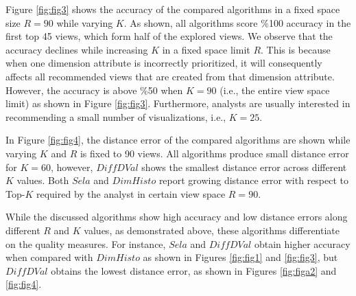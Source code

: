 Figure \ref{fig:fig3} shows the accuracy of the compared algorithms in a fixed space size $R=90$ while varying $K$. 
%
As shown, all algorithms score \%100 accuracy in the first top 45 views, which form half of the explored views.
%
We observe that the accuracy declines while increasing $K$ in a fixed space limit $R$.
% 
This is because when one dimension attribute is incorrectly prioritized, it will consequently affects all 
recommended views that are created from that dimension attribute. 
%
However, the accuracy is above \%50 when $K=90$ (i.e., the entire view space limit) as shown in Figure \ref{fig:fig3}. 
%
Furthermore, analysts are usually interested in recommending a small number of visualizations, i.e., $K=25$.

In Figure \ref{fig:fig4}, the distance error  of the compared algorithms are shown while varying $K$ and $R$ is fixed to 90 views.
%
All algorithms produce small distance error for $K=60$, however, $Diff DVal$ shows the smallest distance error across different $K$ values. 
%
Both $Sela$  and $DimHisto$ report growing distance error with respect to Top-$K$ required by the analyst in certain view space $R=90$.
%

While the discussed algorithms show high accuracy and low distance errors along different $R$ and $K$ values, as  demonstrated above, these algorithms differentiate on the quality measures.
%
For instance, $Sela$ and $Diff DVal$ obtain higher accuracy when compared with $DimHisto$ as shown in Figures \ref{fig:fig1} and \ref{fig:fig3}, but $Diff DVal$ obtains the lowest distance error, as shown in Figures \ref{fig:figa2} and \ref{fig:fig4}.
